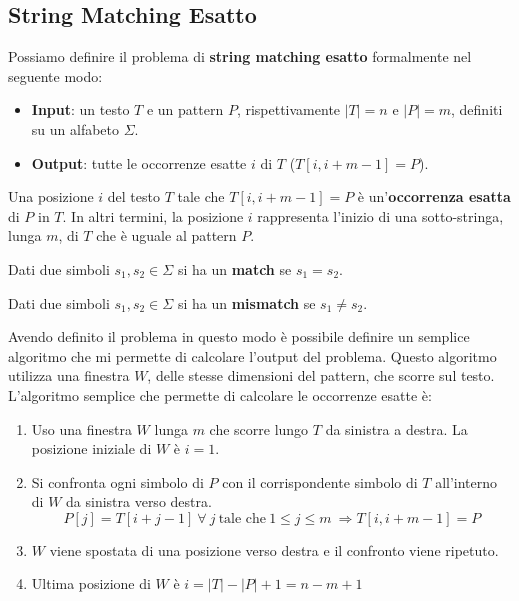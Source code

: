 \subsection{String Matching Esatto}
Possiamo definire il problema di \textbf{string matching esatto} formalmente nel
seguente modo:
\begin{itemize}
    \item \textbf{Input}: un testo $T$ e un pattern $P$, rispettivamente
          $|T|=n$ e $|P|=m$, definiti su un alfabeto $\Sigma$.
    \item \textbf{Output}: tutte le occorrenze esatte $i$ di $T$ ($T[i,i+m-1]=P$).
\end{itemize}
\begin{definizione}
    Una posizione $i$ del testo $T$ tale che $T[i, i + m - 1] = P$ è
    un'\textbf{occorrenza esatta} di $P$ in $T$. In altri termini, la posizione
    $i$ rappresenta l'inizio di una sotto-stringa, lunga $m$, di $T$ che è uguale
    al pattern $P$.
\end{definizione}
\begin{definizione}
    Dati due simboli $s_1, s_2 \in \Sigma$ si ha un \textbf{match} se $s_1 = s_2$.
\end{definizione}
\begin{definizione}
    Dati due simboli $s_1, s_2 \in \Sigma$ si ha un \textbf{mismatch} se $s_1
        \neq s_2$.
\end{definizione}
Avendo definito il problema in questo modo è possibile definire un semplice
algoritmo che mi permette di calcolare l'output del problema. Questo algoritmo
utilizza una finestra $W$, delle stesse dimensioni del pattern, che scorre sul
testo. L'algoritmo semplice che permette di calcolare le occorrenze esatte è:
\begin{enumerate}
    \item Uso una finestra $W$ lunga $m$ che scorre lungo $T$ da sinistra a
          destra. La posizione iniziale di $W$ è $i = 1$.
    \item Si confronta ogni simbolo di $P$ con il corrispondente simbolo di $T$
          all'interno di $W$ da sinistra verso destra.
          \begin{equation}
              P[j] = T[i + j - 1] \ \forall \ j \ \text{tale che} \ 1 \leq j
              \leq m \ \Rightarrow T[i, i + m - 1] = P
          \end{equation}
    \item $W$ viene spostata di una posizione verso destra e il confronto viene
          ripetuto.
    \item Ultima posizione di $W$ è $i = |T| - |P| + 1 = n - m + 1$
\end{enumerate}
